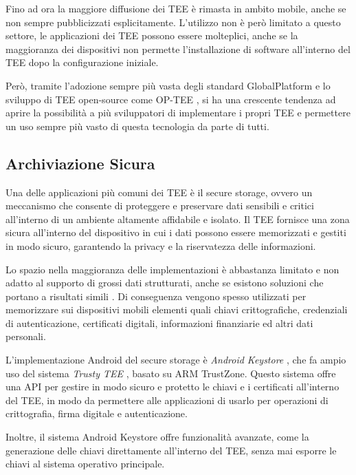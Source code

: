 \documentclass[12pt,italian]{report}
\begin{document}
	Fino ad ora la maggiore diffusione dei TEE è rimasta in ambito mobile, anche se non sempre pubblicizzati esplicitamente. L'utilizzo non è però limitato a questo settore, le applicazioni dei TEE possono essere molteplici, anche se la maggioranza dei dispositivi non permette l'installazione di software all'interno del TEE dopo la configurazione iniziale.
	
	\bigbreak
	
	Però, tramite l'adozione sempre più vasta degli standard GlobalPlatform e lo sviluppo di TEE open-source come OP-TEE \cite{optee}, si ha una crescente tendenza ad aprire la possibilità a più sviluppatori di implementare i propri TEE e permettere un uso sempre più vasto di questa tecnologia da parte di tutti.
	
	
	\subsection{Archiviazione Sicura}
	\label{subsec:secure-storage}
	Una delle applicazioni più comuni dei TEE è il secure storage, ovvero un meccanismo che consente di proteggere e preservare dati sensibili e critici all'interno di un ambiente altamente affidabile e isolato. Il TEE fornisce una zona sicura all'interno del dispositivo in cui i dati possono essere memorizzati e gestiti in modo sicuro, garantendo la privacy e la riservatezza delle informazioni.
	
	Lo spazio nella maggioranza delle implementazioni è abbastanza limitato e non adatto al supporto di grossi dati strutturati, anche se esistono soluzioni che portano a risultati simili \cite{priebe2018enclavedb} \cite{ribeiro2018dbstore}. Di conseguenza vengono spesso utilizzati per memorizzare sui dispositivi mobili elementi quali chiavi crittografiche, credenziali di autenticazione, certificati digitali, informazioni finanziarie ed altri dati personali.
	
	\bigbreak
	
	L'implementazione Android del secure storage è \textit{Android Keystore} \cite{androidkeystore}, che fa ampio uso del sistema \textit{Trusty TEE} \cite{androidtrustytee}, basato su ARM TrustZone. Questo sistema offre una API per gestire in modo sicuro e protetto le chiavi e i certificati all'interno del TEE, in modo da permettere alle applicazioni di usarlo per operazioni di crittografia, firma digitale e autenticazione.
	
	Inoltre, il sistema Android Keystore offre funzionalità avanzate, come la generazione delle chiavi direttamente all'interno del TEE, senza mai esporre le chiavi al sistema operativo principale. 
	
\end{document}
